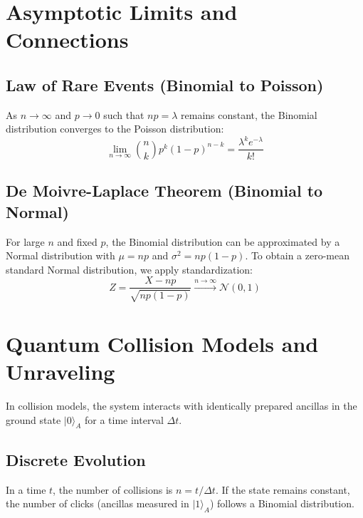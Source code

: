 \documentclass[a4paper,12pt]{article}
\begin{document}
\section{Asymptotic Limits and Connections}

\subsection{Law of Rare Events (Binomial to Poisson)}
As $n \to \infty$ and $p \to 0$ such that $np = \lambda$ remains constant, the Binomial distribution converges to the Poisson distribution:
\begin{equation}
	\lim_{n \to \infty} \binom{n}{k} p^k (1-p)^{n-k} = \frac{\lambda^k e^{-\lambda}}{k!}
\end{equation}

\subsection{De Moivre-Laplace Theorem (Binomial to Normal)}
For large $n$ and fixed $p$, the Binomial distribution can be approximated by a Normal distribution with $\mu = np$ and $\sigma^2 = np(1-p)$. To obtain a zero-mean standard Normal distribution, we apply standardization:
\begin{equation}
	Z = \frac{X - np}{\sqrt{np(1-p)}} \xrightarrow{n \to \infty} \mathcal{N}(0,1)
\end{equation}

\section{Quantum Collision Models and Unraveling}

In collision models, the system interacts with identically prepared ancillas in the ground state $|0\rangle_A$ for a time interval $\Delta t$.

\subsection{Discrete Evolution}
In a time $t$, the number of collisions is $n = t/\Delta t$. If the state remains constant, the number of clicks (ancillas measured in $|1\rangle_A$) follows a Binomial distribution.
\end{document}
